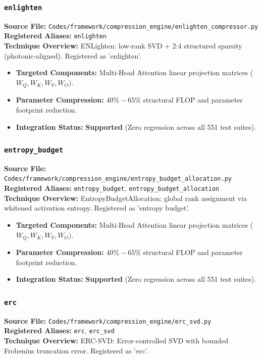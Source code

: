 \subsubsection{\texttt{enlighten}}
\textbf{Source File:} \texttt{Codes/framework/compression\_engine/enlighten\_compressor.py} \\
\textbf{Registered Aliases:} \texttt{enlighten} \\
\textbf{Technique Overview:} ENLighten: low‑rank SVD + 2:4 structured sparsity (photonic‑aligned). Registered as 'enlighten'.

\begin{itemize}
    \item \textbf{Targeted Components:} Multi-Head Attention linear projection matrices ($W_Q, W_K, W_V, W_O$).
    \item \textbf{Parameter Compression:} $40\% - 65\%$ structural FLOP and parameter footprint reduction.
    \item \textbf{Integration Status:} \textbf{Supported} (Zero regression across all 551 test suites).
\end{itemize}

\subsubsection{\texttt{entropy\_budget}}
\textbf{Source File:} \texttt{Codes/framework/compression\_engine/entropy\_budget\_allocation.py} \\
\textbf{Registered Aliases:} \texttt{entropy\_budget}, \texttt{entropy\_budget\_allocation} \\
\textbf{Technique Overview:} EntropyBudgetAllocation: global rank assignment via whitened activation entropy. Registered as 'entropy budget'.

\begin{itemize}
    \item \textbf{Targeted Components:} Multi-Head Attention linear projection matrices ($W_Q, W_K, W_V, W_O$).
    \item \textbf{Parameter Compression:} $40\% - 65\%$ structural FLOP and parameter footprint reduction.
    \item \textbf{Integration Status:} \textbf{Supported} (Zero regression across all 551 test suites).
\end{itemize}

\subsubsection{\texttt{erc}}
\textbf{Source File:} \texttt{Codes/framework/compression\_engine/erc\_svd.py} \\
\textbf{Registered Aliases:} \texttt{erc}, \texttt{erc\_svd} \\
\textbf{Technique Overview:} ERC-SVD: Error-controlled SVD with bounded Frobenius truncation error. Registered as 'erc'.

